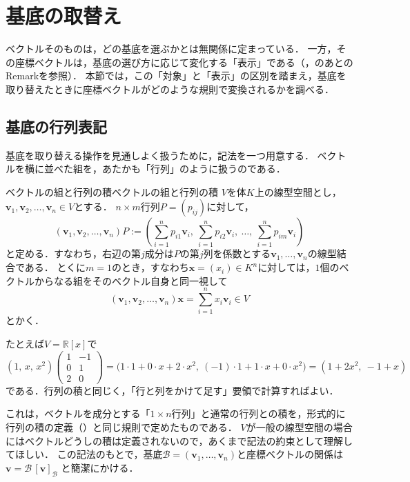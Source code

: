 \section{基底の取替え}

ベクトルそのものは，どの基底を選ぶかとは無関係に定まっている．
一方，その座標ベクトルは，基底の選び方に応じて変化する「表示」である（，のあとのRemarkを参照）．
本節では，この「対象」と「表示」の区別を踏まえ，基底を取り替えたときに座標ベクトルがどのような規則で変換されるかを調べる．

\subsection{基底の行列表記}

基底を取り替える操作を見通しよく扱うために，記法を一つ用意する．
ベクトルを横に並べた組を，あたかも「行列」のように扱うのである．

\begin{definition}{ベクトルの組と行列の積}{ベクトルの組と行列の積}
  $V$を体$K$上の線型空間とし，$\bm{v}_1, \bm{v}_2, \dots, \bm{v}_n \in V$とする．
  $n \times m$行列$P = (p_{ij})$に対して，
  \[
    (\bm{v}_1, \bm{v}_2, \dots, \bm{v}_n) P
    :=
    \left( \sum_{i=1}^{n} p_{i1} \bm{v}_i,~ \sum_{i=1}^{n} p_{i2} \bm{v}_i,~ \dots,~ \sum_{i=1}^{n} p_{im} \bm{v}_i \right)
  \]
  と定める．すなわち，右辺の第$j$成分は$P$の第$j$列を係数とする$\bm{v}_1, \dots, \bm{v}_n$の線型結合である．
  とくに$m=1$のとき，すなわち$\bm{x} = (x_i) \in K^n$に対しては，$1$個のベクトルからなる組をそのベクトル自身と同一視して
  \[
    (\bm{v}_1, \bm{v}_2, \dots, \bm{v}_n) \bm{x}
    = \sum_{i=1}^{n} x_i \bm{v}_i \in V
  \]
  とかく．
\end{definition}

たとえば$V=\mathbb{R}[x]$で
\[
  (1,\,x,\,x^2)\begin{pmatrix} 1 & -1 \\ 0 & 1 \\ 2 & 0 \end{pmatrix}
  =\bigl(1\cdot1+0\cdot x+2\cdot x^2,~ (-1)\cdot1+1\cdot x+0\cdot x^2\bigr)
  =(1+2x^2,~ -1+x)
\]
である．行列の積と同じく，「行と列をかけて足す」要領で計算すればよい．

\begin{remark}[形式的な行列記法について]
  これは，ベクトルを成分とする「$1 \times n$行列」と通常の行列との積を，形式的に行列の積の定義（）と同じ規則で定めたものである．
  $V$が一般の線型空間の場合にはベクトルどうしの積は定義されないので，あくまで記法の約束として理解してほしい．
  この記法のもとで，基底$\mathcal{B} = (\bm{v}_1, \dots, \bm{v}_n)$と座標ベクトルの関係は
  $\bm{v} = \mathcal{B} \, [\bm{v}]_{\mathcal{B}}$
  と簡潔にかける．
\end{remark}

